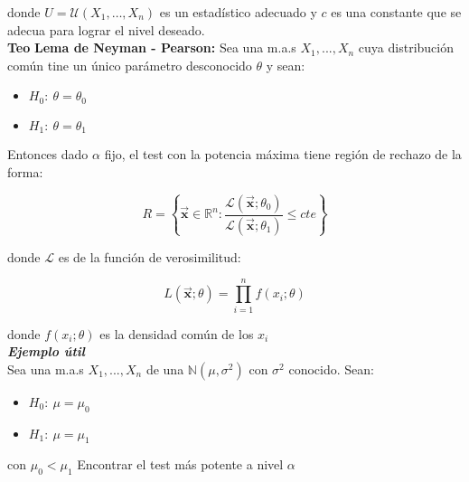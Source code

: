 \documentclass[letterpaper,10.5pt,twocolumn]{article} %
\newcommand{\R}[1][]{\mathbb{R}^{#1}}
\newcommand{\N}{\mathbb{N} }
\newcommand{\mas}{X_1, ..., X_n}
\newcommand{\vect}[1]{\boldsymbol{\vec{#1}}}
\newcommand{\normal}[2]{\N({#1},{#2})}
\newcommand{\hlc}[2][yellow]{ \colorbox{#1}{#2} }
\newcommand{\Teo}{\hlc[applegreen]{\bfseries Teo}}
\begin{document}
donde $U=\mathcal{U} (X_1,\ldots,X_n) $ es un estadístico adecuado y $c$ es una constante que se adecua para lograr el nivel deseado.\\

\Teo \textbf{Lema de Neyman - Pearson:} Sea una m.a.s $\mas$ cuya distribución común tine un único parámetro desconocido $\theta$ y sean:
\begin{itemize}
	\item $H_0:\ \theta = \theta_0 $
	\item $H_1:\ \theta = \theta_1 $
\end{itemize}

Entonces dado $\alpha $ fijo, el test con la potencia máxima tiene región de rechazo de la forma:

\begin{equation*}
	R =  \left\{\vect{x} \in \R[n] : \dfrac{\mathcal{L}(\vect{x};\theta_0) }{\mathcal{L}(\vect{x};\theta_1)} \leq cte \right\}
\end{equation*}

donde $\mathcal{L} $ es de la función de verosimilitud:

\begin{equation*}
	L(\vect{x};\theta) = \prod_{i=1}^{n} f(x_i;\theta)
\end{equation*}

donde $f(x_i;\theta) $ es la densidad común de los $x_i$\\

\textbf{\textit{Ejemplo útil}}\\

Sea una m.a.s $\mas$ de una $\normal{\mu}{\sigma^2}$ con $\sigma^{2}$ conocido. Sean:
\begin{itemize}
	\item $H_0:\ \mu = \mu_0 $
	\item $H_1:\ \mu = \mu_1 $
\end{itemize}
con $\mu_0<\mu_1 $
Encontrar el test más potente a nivel $\alpha$
\end{document}
